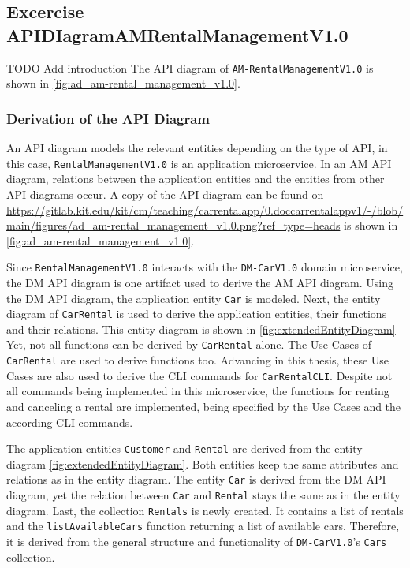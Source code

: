 \subsection{Excercise APIDIagramAMRentalManagementV1.0}
TODO Add introduction
The API diagram of \texttt{AM-RentalManagementV1.0} is shown in \autoref{fig:ad_am-rental_management_v1.0}.
\subsubsection*{Derivation of the API Diagram}
An API diagram models the relevant entities depending on the type of API, in this case, \hfill \linebreak \texttt{RentalManagementV1.0} is an application microservice.
In an AM API diagram, relations between the application entities and the entities from other API diagrams occur.
A copy of the API diagram can be found on \url{https://gitlab.kit.edu/kit/cm/teaching/carrentalapp/0.doccarrentalappv1/-/blob/main/figures/ad_am-rental_management_v1.0.png?ref_type=heads} is shown in \autoref*{fig:ad_am-rental_management_v1.0}.

Since \texttt{RentalManagementV1.0} interacts with the \texttt{DM-CarV1.0} domain microservice, the DM API diagram is one artifact used to derive the AM API diagram.
Using the DM API diagram, the application entity \texttt{Car} is modeled.
Next, the entity diagram of \texttt{CarRental} is used to derive the application entities, their functions and their relations.
This entity diagram is shown in \autoref{fig:extendedEntityDiagram}
Yet, not all functions can be derived by \texttt{CarRental} alone.
The Use Cases of \texttt{CarRental} are used to derive functions too.
Advancing in this thesis, these Use Cases are also used to derive the CLI commands for \texttt{CarRentalCLI}.
Despite not all commands being implemented in this microservice, the functions for renting and canceling a rental are implemented, being specified by the Use Cases and the according CLI commands.

The application entities \texttt{Customer} and \texttt{Rental} are derived from the entity diagram \autoref{fig:extendedEntityDiagram}.
Both entities keep the same attributes and relations as in the entity diagram.
The entity \texttt{Car} is derived from the DM API diagram, yet the relation between \texttt{Car} and \texttt{Rental} stays the same as in the entity diagram.
Last, the collection \texttt{Rentals} is newly created.
It contains a list of rentals and the \texttt{listAvailableCars} function returning a list of available cars.
Therefore, it is derived from the general structure and functionality of \texttt{DM-CarV1.0}'s \texttt{Cars} collection.

